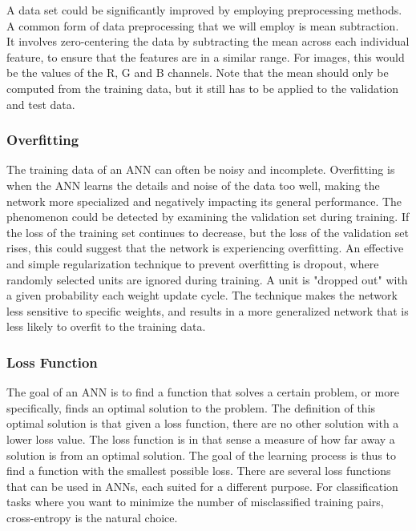 A data set could be significantly improved by employing preprocessing methods. A common form of data preprocessing that we will employ is mean subtraction. It involves zero-centering the data by subtracting the mean across each individual feature, to ensure that the features are in a similar range. For images, this would be the values of the R, G and B channels. Note that the mean should only be computed from the training data, but it still has to be applied to the validation and test data.

\subsubsection{Overfitting}

The training data of an ANN can often be noisy and incomplete. Overfitting is when the ANN learns the details and noise of the data too well, making the network more specialized and negatively impacting its general performance. The phenomenon could be detected by examining the validation set during training. If the loss of the training set continues to decrease, but the loss of the validation set rises, this could suggest that the network is experiencing overfitting. An effective and simple regularization technique to prevent overfitting is dropout, where randomly selected units are ignored during training. A unit is "dropped out" with a given probability each weight update cycle. The technique makes the network less sensitive to specific weights, and results in a more generalized network that is less likely to overfit to the training data.

\subsubsection{Loss Function}

\noindent The goal of an ANN is to find a function that solves a certain problem, or more specifically, finds an optimal solution to the problem. The definition of this optimal solution is that given a loss function, there are no other solution with a lower loss value. The loss function is in that sense a measure of how far away a solution is from an optimal solution. The goal of the learning process is thus to find a function with the smallest possible loss. There are several loss functions that can be used in ANNs, each suited for a different purpose. For classification tasks where you want to minimize the number of misclassified training pairs, cross-entropy is the natural choice.

